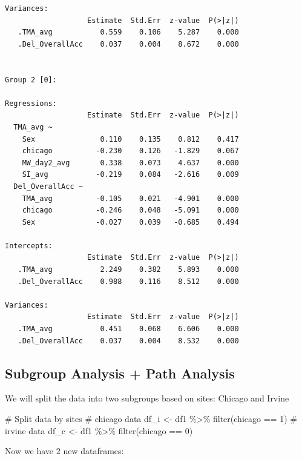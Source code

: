 \documentclass[
  letterpaper,
  DIV=11,
  numbers=noendperiod]{scrartcl}
\newenvironment{Shaded}{\begin{snugshade}}{\end{snugshade}}
\newcommand{\CommentTok}[1]{\textcolor[rgb]{0.37,0.37,0.37}{#1}}
\newcommand{\DecValTok}[1]{\textcolor[rgb]{0.68,0.00,0.00}{#1}}
\newcommand{\FunctionTok}[1]{\textcolor[rgb]{0.28,0.35,0.67}{#1}}
\newcommand{\NormalTok}[1]{\textcolor[rgb]{0.00,0.23,0.31}{#1}}
\newcommand{\OtherTok}[1]{\textcolor[rgb]{0.00,0.23,0.31}{#1}}
\newcommand{\SpecialCharTok}[1]{\textcolor[rgb]{0.37,0.37,0.37}{#1}}
\begin{document}
\begin{verbatim}
Variances:
                   Estimate  Std.Err  z-value  P(>|z|)
   .TMA_avg           0.559    0.106    5.287    0.000
   .Del_OverallAcc    0.037    0.004    8.672    0.000


Group 2 [0]:

Regressions:
                   Estimate  Std.Err  z-value  P(>|z|)
  TMA_avg ~                                           
    Sex               0.110    0.135    0.812    0.417
    chicago          -0.230    0.126   -1.829    0.067
    MW_day2_avg       0.338    0.073    4.637    0.000
    SI_avg           -0.219    0.084   -2.616    0.009
  Del_OverallAcc ~                                    
    TMA_avg          -0.105    0.021   -4.901    0.000
    chicago          -0.246    0.048   -5.091    0.000
    Sex              -0.027    0.039   -0.685    0.494

Intercepts:
                   Estimate  Std.Err  z-value  P(>|z|)
   .TMA_avg           2.249    0.382    5.893    0.000
   .Del_OverallAcc    0.988    0.116    8.512    0.000

Variances:
                   Estimate  Std.Err  z-value  P(>|z|)
   .TMA_avg           0.451    0.068    6.606    0.000
   .Del_OverallAcc    0.037    0.004    8.532    0.000
\end{verbatim}

\hypertarget{subgroup-analysis-path-analysis}{%
\subsection{Subgroup Analysis + Path
Analysis}\label{subgroup-analysis-path-analysis}}

We will split the data into two subgroups based on sites: Chicago and
Irvine

\begin{Shaded}
\begin{Highlighting}[]
\CommentTok{\# Split data by sites}
\CommentTok{\# chicago data}
\NormalTok{df\_i }\OtherTok{\textless{}{-}}\NormalTok{ df1 }\SpecialCharTok{\%\textgreater{}\%} \FunctionTok{filter}\NormalTok{(chicago }\SpecialCharTok{==} \DecValTok{1}\NormalTok{)}
\CommentTok{\# irvine data}
\NormalTok{df\_c }\OtherTok{\textless{}{-}}\NormalTok{ df1 }\SpecialCharTok{\%\textgreater{}\%} \FunctionTok{filter}\NormalTok{(chicago }\SpecialCharTok{==} \DecValTok{0}\NormalTok{)}
\end{Highlighting}
\end{Shaded}

Now we have 2 new dataframes:
\end{document}
